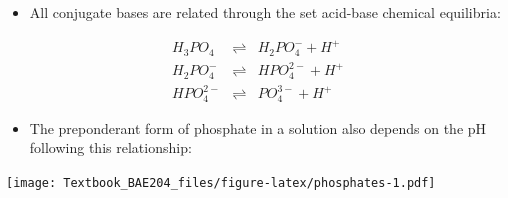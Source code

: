 \documentclass[]{book}
\providecommand{\tightlist}{%
  \setlength{\itemsep}{0pt}\setlength{\parskip}{0pt}}
\theoremstyle{definition}
\theoremstyle{definition}
\theoremstyle{definition}
\theoremstyle{remark}
\begin{document}
\begin{itemize}
\tightlist
\item
  All conjugate bases are related through the set acid-base chemical
  equilibria:
\end{itemize}

\begin{align}
H_3PO_4  & \rightleftharpoons & H_2PO_4^- + H^+ \tag{$pK_A$ = 2.12}\\
H_2PO_4^- & \rightleftharpoons & HPO_4^{2-} + H^+ \tag{$pK_A$ = 7.21}\\
HPO_4^{2-}& \rightleftharpoons & PO_4^{3-} + H^+ \tag{$pK_A$ = 12.67}
\end{align}

\begin{itemize}
\tightlist
\item
  The preponderant form of phosphate in a solution also depends on the
  pH following this relationship:
\end{itemize}

\texttt{[image: Textbook\_BAE204\_files/figure-latex/phosphates-1.pdf]}
\end{document}
